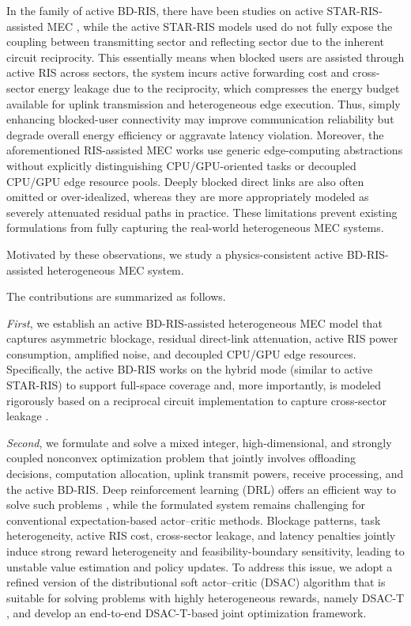 \documentclass[conference]{IEEEtran}
\begin{document}
In the family of active BD-RIS, there have been studies on active STAR-RIS-assisted MEC \cite{aung2025active,qin2025resource}, while the active STAR-RIS models used do not fully expose the coupling between transmitting sector and reflecting sector due to the inherent circuit reciprocity.   
This essentially means when blocked users are assisted through active RIS across sectors, the system incurs active forwarding cost and cross-sector energy leakage due to the reciprocity, which compresses the energy budget available for uplink transmission and heterogeneous edge execution. Thus, simply enhancing blocked-user connectivity may improve communication reliability but degrade overall energy efficiency or aggravate latency violation.
Moreover, the aforementioned RIS-assisted MEC works use generic edge-computing abstractions without explicitly distinguishing CPU/GPU-oriented tasks or decoupled CPU/GPU edge resource pools. Deeply blocked direct links are also often omitted or over-idealized, whereas they are more appropriately modeled as severely attenuated residual paths in practice. These limitations prevent existing formulations from fully capturing the real-world heterogeneous MEC systems.



Motivated by these observations, we study a physics-consistent active BD-RIS-assisted heterogeneous MEC system.

The contributions are summarized as follows. 

\textit{First}, we establish an active BD-RIS-assisted heterogeneous MEC model that captures asymmetric blockage, residual direct-link attenuation, active RIS power consumption, amplified noise, and decoupled CPU/GPU edge resources. 
Specifically, the active BD-RIS works on the hybrid mode (similar to active STAR-RIS) to support full-space coverage and, more importantly, is modeled rigorously based on a reciprocal circuit implementation to capture cross-sector leakage \cite{liu2026active}. 

\textit{Second}, we formulate and solve a mixed integer, high-dimensional, and strongly coupled nonconvex optimization problem that jointly involves offloading decisions, computation allocation, uplink transmit powers, receive processing, and the active BD-RIS. 
Deep reinforcement learning (DRL) offers an efficient way to solve such problems \cite{Huang2020DRLOnlineOffloadingMEC,Peng2023RobustDRLForEHRIS}, while the formulated system remains challenging for conventional expectation-based actor--critic methods. Blockage patterns, task heterogeneity, active RIS cost, cross-sector leakage, and latency penalties jointly induce strong reward heterogeneity and feasibility-boundary sensitivity, leading to unstable value estimation and policy updates. 
To address this issue, we adopt a refined version of the distributional soft actor--critic (DSAC) algorithm that is suitable for solving problems with highly heterogeneous rewards, namely DSAC-T \cite{Duan2025DSACT}, and develop an end-to-end DSAC-T-based joint optimization framework. 
\end{document}
